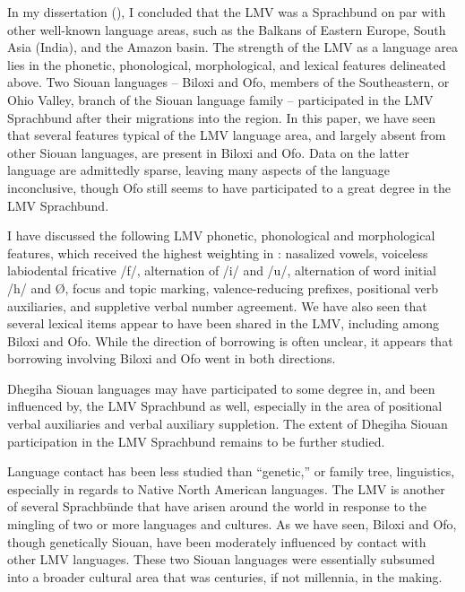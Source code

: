 \documentclass[output=paper]{LSP/langsci}
\begin{document}
In my dissertation (\citealt[3]{Kaufman2014}), I concluded that the LMV was a Sprachbund on par with other well-known language areas, such as the Balkans of Eastern Europe, South Asia (India), and the Amazon basin. The strength of the LMV as a language area lies in the phonetic, phonological, morphological, and lexical features delineated above. Two Siouan languages -- Biloxi and Ofo, members of the Southeastern, or Ohio Valley, branch of the Siouan language family -- participated in the LMV Sprachbund after their migrations into the region. In this paper, we have seen that several features typical of the LMV language area, and largely absent from other Siouan languages, are present in Biloxi and Ofo. Data on the latter language are admittedly sparse, leaving many aspects of the language inconclusive, though Ofo still seems to have participated to a great degree in the LMV Sprachbund. 

I have discussed the following LMV phonetic, phonological and morphological features, which received the highest weighting in \citet{Kaufman2014}: nasalized vowels, voiceless labiodental fricative /f/, alternation of /i/ and /u/, alternation of word initial /h/ and Ø, focus and topic marking, valence-reducing prefixes, positional verb auxiliaries, and suppletive verbal number agreement. We have also seen that several lexical items appear to have been shared in the LMV, including among Biloxi and Ofo. While the direction of borrowing is often unclear, it appears that borrowing involving Biloxi and Ofo went in both directions.

Dhegiha Siouan languages may have participated to some degree in, and been influenced by, the LMV Sprachbund as well, especially in the area of positional verbal auxiliaries and verbal auxiliary suppletion. The extent of Dhegiha Siouan participation in the LMV Sprachbund remains to be further studied.

Language contact has been less studied than “genetic,” or family tree, linguistics, especially in regards to Native North American languages. The LMV is another of several Sprachbünde that have arisen around the world in response to the mingling of two or more languages and cultures. As we have seen, Biloxi and Ofo, though genetically Siouan, have been moderately influenced by contact with other LMV languages. These two Siouan languages were essentially subsumed into a broader cultural area that was centuries, if not millennia, in the making. 
\end{document}
